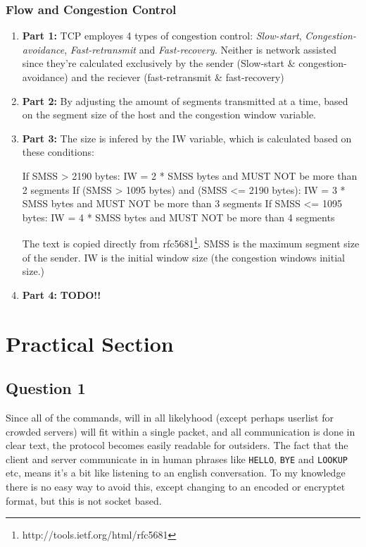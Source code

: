 \documentclass[10pt]{article}
\begin{document}
\subsubsection{Flow and Congestion Control}
\begin{enumerate}
  \item \textbf{Part 1:} TCP employes 4 types of congestion control:
        \textit{Slow-start}, \textit{Congestion-avoidance},
        \textit{Fast-retransmit} and \textit{Fast-recovery}. Neither is network
        assisted since they're calculated exclusively by the sender (Slow-start
        \& congestion-avoidance) and the reciever (fast-retransmit \&
        fast-recovery)
  \item \textbf{Part 2:} By adjusting the amount of segments transmitted at a
        time, based on the segment size of the host and the congestion window
        variable.
  \item \textbf{Part 3:} The size is infered by the IW variable, which is
        calculated based on these conditions:
\begin{verbatim*}
If SMSS > 2190 bytes:
       IW = 2 * SMSS bytes and MUST NOT be more than 2 segments
If (SMSS > 1095 bytes) and (SMSS <= 2190 bytes):
       IW = 3 * SMSS bytes and MUST NOT be more than 3 segments
If SMSS <= 1095 bytes:
       IW = 4 * SMSS bytes and MUST NOT be more than 4 segments
\end{verbatim*}
        The text is copied directly from
        rfc5681\footnote{http://tools.ietf.org/html/rfc5681}. SMSS is the
        maximum segment size of the sender. IW is the initial  window size
        (the congestion windows initial size.)
  \item \textbf{Part 4:} \textbf{TODO!!} %
\end{enumerate}



\section{Practical Section}

\subsection{Question 1}
Since all of the commands, will in all likelyhood (except perhaps
userlist for crowded servers) will fit within a single packet, and all
communication is done in clear text, the protocol becomes easily
readable for outsiders. The fact that the client and server
communicate in in human phrases like \texttt{HELLO}, \texttt{BYE} and
\texttt{LOOKUP} etc, means it's a bit like listening to an english
conversation. To my knowledge there is no easy way to avoid this,
except changing to an encoded or encryptet format, but this is not
socket based.
\end{document}
